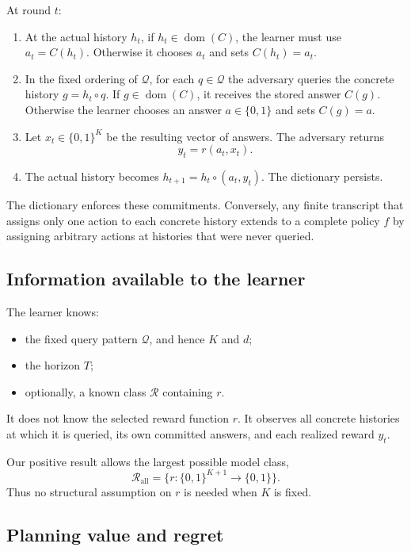 \documentclass[11pt]{article}
\newcommand{\QQ}{\mathcal Q}
\newcommand{\RR}{\mathcal R}
\newcommand{\dom}{\operatorname{dom}}
\begin{document}
At round $t$:
\begin{enumerate}[label=\arabic*.]
    \item At the actual history $h_t$, if $h_t\in\dom(C)$, the learner must use $a_t=C(h_t)$.  Otherwise it chooses $a_t$ and sets $C(h_t)=a_t$.

    \item In the fixed ordering of $\QQ$, for each $q\in\QQ$ the adversary queries the concrete history $g=h_t\circ q$.  If $g\in\dom(C)$, it receives the stored answer $C(g)$.  Otherwise the learner chooses an answer $a\in\{0,1\}$ and sets $C(g)=a$.

    \item Let $x_t\in\{0,1\}^{K}$ be the resulting vector of answers.  The adversary returns
    \[
        y_t=r(a_t,x_t).
    \]

    \item The actual history becomes $h_{t+1}=h_t\circ(a_t,y_t)$.  The dictionary persists.
\end{enumerate}

The dictionary enforces these commitments.  Conversely, any finite transcript that assigns only one action to each concrete history extends to a complete policy $f$ by assigning arbitrary actions at histories that were never queried.

\subsection{Information available to the learner}

The learner knows:
\begin{itemize}
    \item the fixed query pattern $\QQ$, and hence $K$ and $d$;
    \item the horizon $T$;
    \item optionally, a known class $\RR$ containing $r$.
\end{itemize}
It does not know the selected reward function $r$.  It observes all concrete histories at which it is queried, its own committed answers, and each realized reward $y_t$.

Our positive result allows the largest possible model class,
\[
    \RR_{\mathrm{all}}
    =\bigl\{r:\{0,1\}^{K+1}\to\{0,1\}\bigr\}.
\]
Thus no structural assumption on $r$ is needed when $K$ is fixed.

\subsection{Planning value and regret}
\end{document}
